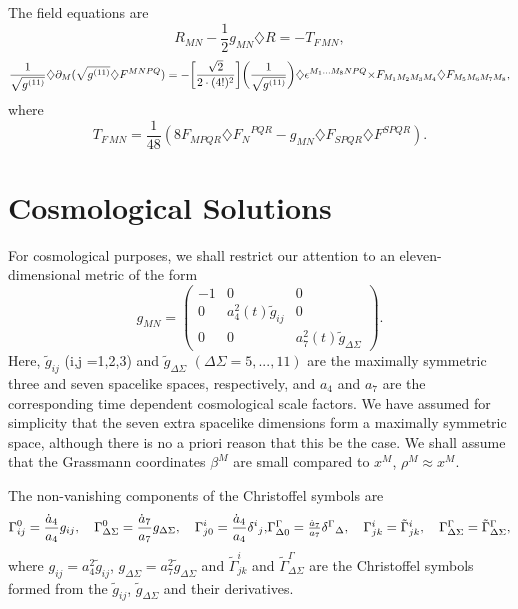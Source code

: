 \documentclass[a4paper,12pt]{article}
\begin{document}
The field equations are
\begin{equation}
R_{MN}-\frac{1}{2}g_{MN}\diamondsuit R=-T_{F\,MN},
\end{equation}
\begin{equation}
\label{Fequation}
\frac{1}{\sqrt{g^{(11)}}}\diamondsuit\partial_M(\sqrt{g^{(11)}}\diamondsuit
F^{MNPQ})
=-\biggl[\frac{\sqrt{2}}{2\cdot(4!)^2}\biggr]\biggl(\frac{1}{\sqrt{g^{(11)}}}\biggr)
\diamondsuit\epsilon^{M_1...M_8NPQ}
$$ $$ \times
F_{M_1M_2M_3M_4}\diamondsuit
F_{M_5M_6M_7M_8},
\end{equation}
where
\begin{equation}
\label{Ftensor}
T_{F\,MN}=\frac{1}{48}(8F_{MPQR}\diamondsuit {F_N}^{PQR}-g_{MN}\diamondsuit
F_{SPQR}\diamondsuit F^{SPQR}).
\end{equation}

\section{Cosmological Solutions}

For cosmological purposes, we shall restrict our attention to an
eleven-dimensional metric of the form
\begin{equation}
g_{MN}=\left(\begin{array}{ccc}
        -1&0&0\\
        0 & a_4^2(t){\tilde g}_{ij}&0\\
        0 & 0 & a_7^2(t){\tilde {g}}_{\Delta\Sigma}
        \end{array}\right).
\end{equation}
Here, $\tilde{g}_{ij}$ (i,j =1,2,3) and $\tilde{g}_{\Delta\Sigma}$
$(\Delta\Sigma=5,...,11)$ are the maximally symmetric three and seven
spacelike spaces, respectively, and $a_4$ and $a_7$ are the corresponding
time dependent cosmological scale factors. We have assumed for simplicity
that the seven extra spacelike dimensions form a maximally symmetric space,
although there is no a priori reason that this be the case. We shall assume
that the Grassmann coordinates $\beta^M$ are small compared to $x^M$,
$\rho^M\approx x^M$.

The non-vanishing components of the Christoffel symbols are
\begin{equation}
\Gamma^0_{ij}=\frac{{\dot a}_4}{a_4}g_{ij},\quad
\Gamma^0_{\Delta\Sigma}=\frac{{\dot a}_7}{a_7}g_{\Delta\Sigma},\quad
\Gamma^i_{j0}=\frac{{\dot a}_4}{a_4}{\delta^i}_j,
$$ $$
\Gamma^\Gamma_{\Delta 0}=\frac{{\dot
a}_7}{a_7}{\delta^\Gamma}_\Delta,\quad
\Gamma^i_{jk}={\tilde\Gamma}^i_{jk},\quad
\Gamma^\Gamma_{\Delta\Sigma}={\tilde\Gamma}^\Gamma_{\Delta\Sigma},
\end{equation} where $g_{ij}=a^2_4{\tilde g}_{ij}$,
$g_{\Delta\Sigma}=a^2_7{\tilde g}_{\Delta\Sigma}$ and
${\tilde\Gamma}^i_{jk}$ and ${\tilde\Gamma}^\Gamma_{\Delta\Sigma}$ are the
Christoffel symbols formed from the ${\tilde g}_{ij}$, ${\tilde
g}_{\Delta\Sigma}$ and their derivatives.
\end{document}
